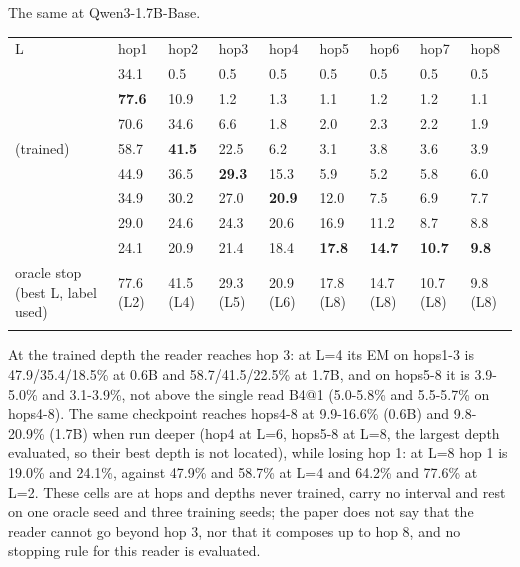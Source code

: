 The same at Qwen3-1.7B-Base.  %


{\footnotesize
\setlength{\tabcolsep}{3pt}
\begin{longtable}{W{111}{18}W{111}{18}W{111}{18}W{111}{18}W{111}{18}W{111}{18}W{111}{18}W{111}{18}W{111}{18}}
\toprule
L & hop1 & hop2 & hop3 & hop4 & hop5 & hop6 & hop7 & hop8 \\ \addlinespace[3pt]
\midrule {} & 34.1 & 0.5 & 0.5 & 0.5 & 0.5 & 0.5 & 0.5 & 0.5 \\  & \textbf{77.6} & 10.9 & 1.2 & 1.3 & 1.1 & 1.2 & 1.2 & 1.1 \\  & 70.6 & 34.6 & 6.6 & 1.8 & 2.0 & 2.3 & 2.2 & 1.9 \\  (trained) & 58.7 & \textbf{41.5} & 22.5 & 6.2 & 3.1 & 3.8 & 3.6 & 3.9 \\  & 44.9 & 36.5 & \textbf{29.3} & 15.3 & 5.9 & 5.2 & 5.8 & 6.0 \\  & 34.9 & 30.2 & 27.0 & \textbf{20.9} & 12.0 & 7.5 & 6.9 & 7.7 \\  & 29.0 & 24.6 & 24.3 & 20.6 & 16.9 & 11.2 & 8.7 & 8.8 \\  & 24.1 & 20.9 & 21.4 & 18.4 & \textbf{17.8} & \textbf{14.7} & \textbf{10.7} & \textbf{9.8} \\ \addlinespace[3pt]
oracle stop (best L, label used) & 77.6 (L2) & 41.5 (L4) & 29.3 (L5) & 20.9 (L6) & 17.8 (L8) & 14.7 (L8) & 10.7 (L8) & 9.8 (L8) \\ \addlinespace[3pt]
\bottomrule
\end{longtable}
}


At the trained depth the reader reaches hop 3: at L=4 its EM on hops1-3 is 47.9/\allowbreak{}35.4/\allowbreak{}18.5\% at 0.6B and 58.7/\allowbreak{}41.5/\allowbreak{}22.5\% at 1.7B, and on hops5-8 it
is 3.9-5.0\% and 3.1-3.9\%, not above the single read B4@1 (5.0-5.8\% and 5.5-5.7\% on hops4-8). The same checkpoint reaches hops4-8 at
9.9-16.6\% (0.6B) and 9.8-20.9\% (1.7B) when run deeper (hop4 at L=6, hops5-8 at L=8, the largest depth evaluated, so their best depth is not
located), while losing hop 1: at L=8 hop 1 is 19.0\% and 24.1\%, against 47.9\% and 58.7\% at L=4 and 64.2\% and 77.6\% at L=2. These
cells are at hops and depths never trained, carry no interval and rest on one oracle seed and three training seeds; the paper does not say that the reader
cannot go beyond hop 3, nor that it composes up to hop 8, and no stopping rule for this reader is evaluated.  %

